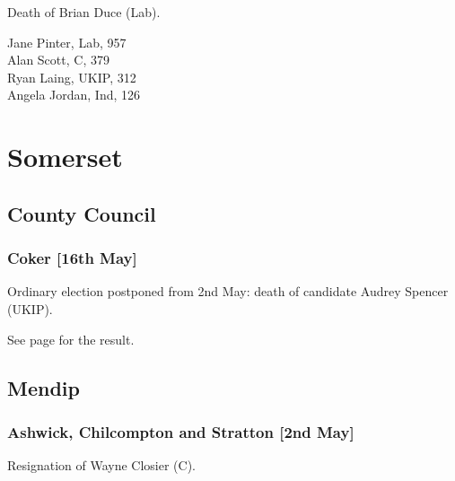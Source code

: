 \documentclass[a4paper,openany,10pt]{book}
\begin{document}

Death of Brian Duce (Lab).



Jane Pinter, Lab, 957\\
Alan Scott, C, 379\\
Ryan Laing, UKIP, 312\\
Angela Jordan, Ind, 126\\


\vfill

\section{Somerset}

\subsection*{County Council}

\subsubsection*{Coker \hspace*{\fill}\nolinebreak[1]%
\enspace\hspace*{\fill}
[16th May]}


Ordinary election postponed from 2nd May: death of candidate Audrey Spencer (UKIP).

See page \pageref{CokerSomerset} for the result.

\subsection*{Mendip}

\subsubsection*{Ashwick, Chilcompton and Stratton \hspace*{\fill}\nolinebreak[1]%
\enspace\hspace*{\fill}
[2nd May]}


Resignation of Wayne Closier (C).
\end{document}
